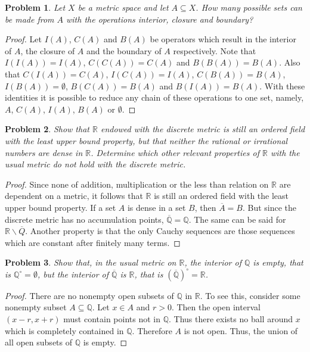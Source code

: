 \documentclass{article}
\newtheorem{problem}{Problem}
\begin{document}
\begin{flushleft}
\begin{problem}
Let $X$ be a metric space and let $A \subseteq X$. How many possible sets can be made from $A$ with the operations interior, closure and boundary?
\end{problem}
\begin{proof}
Let $I(A)$, $C(A)$ and $B(A)$ be operators which result in the interior of $A$, the closure of $A$ and the boundary of $A$ respectively. Note that $I(I(A))=I(A)$, $C(C(A))=C(A)$ and $B(B(A)) = B(A)$. Also that $C(I(A)) = C(A)$, $I(C(A)) = I(A)$, $C(B(A)) = B(A)$, $I(B(A)) = \emptyset$, $B(C(A)) = B(A)$ and $B(I(A)) = B(A)$. With these identities it is possible to reduce any chain of these operations to one set, namely, $A$, $C(A)$, $I(A)$, $B(A)$ or $\emptyset$.
\end{proof}

\begin{problem}
Show that $\mathbb{R}$ endowed with the discrete metric is still an ordered field with the least upper bound property, but that neither the rational or irrational numbers are dense in $\mathbb{R}$. Determine which other relevant properties of $\mathbb{R}$ with the usual metric do not hold with the discrete metric.
\end{problem}
\begin{proof}
Since none of addition, multiplication or the less than relation on $\mathbb{R}$ are dependent on a metric, it follows that $\mathbb{R}$ is still an ordered field with the least upper bound property. If a set $A$ is dense in a set $B$, then $\overline{A} = B$. But since the discrete metric has no accumulation points, $\overline{\mathbb{Q}} = \mathbb{Q}$. The same can be said for $\mathbb{R} \backslash \overline{Q}$. Another property is that the only Cauchy sequences are those sequences which are constant after finitely many terms.
\end{proof}

\begin{problem}
Show that, in the usual metric on $\mathbb{R}$, the interior of $\mathbb{Q}$ is empty, that is $\mathbb{Q}^{\circ} = \emptyset$, but the interior of $\overline{\mathbb{Q}}$ is $\mathbb{R}$, that is $(\overline{\mathbb{Q}})^{\circ} = \mathbb{R}$.
\end{problem}
\begin{proof}
There are no nonempty open subsets of $\mathbb{Q}$ in $\mathbb{R}$. To see this, consider some nonempty subset $A \subseteq \mathbb{Q}$. Let $x \in A$ and $r > 0$. Then the open interval $(x-r, x+r)$ must contain points not in $\mathbb{Q}$. Thus there exists no ball around $x$ which is completely contained in $\mathbb{Q}$. Therefore $A$ is not open. Thus, the union of all open subsets of $\mathbb{Q}$ is empty.\newline


\end{proof}
\end{flushleft}
\end{document}
